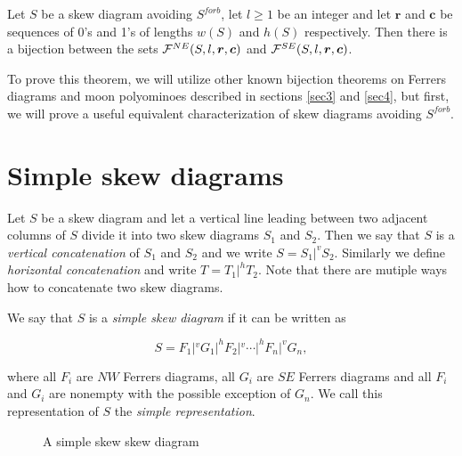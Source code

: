 \begin{thm} \label{thm_main}
Let $S$ be a skew diagram avoiding $S^{forb}$, let $l \geq 1$ be an integer and let $\bm{r}$ and $\bm{c}$ be sequences of 0's
and 1's of lengths $w(S)$ and $h(S)$ respectively. Then there is a bijection between 
the sets $\mathcal{F}^{NE}(S, l, \bm{r}, \bm{c})$ and $\mathcal{F}^{SE}(S, l, \bm{r}, \bm{c})$.
\end{thm}

To prove this theorem, we will utilize other known bijection theorems on Ferrers diagrams and moon polyominoes
described in sections \ref{sec3} and \ref{sec4}, but first,
we will prove a useful equivalent characterization of skew diagrams avoiding $S^{forb}$.

\section{Simple skew diagrams}

Let $S$ be a skew diagram and let a vertical line leading between two adjacent columns of $S$ divide it into two skew diagrams $S_1$ and
$S_2$. Then we say that $S$ is a \emph{vertical concatenation} of $S_1$ and $S_2$ and we write $S = S_1 |^v S_2$. Similarly we define
\emph{horizontal concatenation} and write $T = T_1 |^h T_2$. Note that there are mutiple ways how to concatenate two skew diagrams.

We say that $S$ is a \emph{simple skew diagram} if it can be written as 

$$S = F_1 |^v G_1 |^h F_2 |^v \cdots |^h F_n |^v G_n,$$

where all $F_i$ are $NW$ Ferrers diagrams, all $G_i$ are $SE$ Ferrers diagrams and all $F_i$ and $G_i$ are nonempty with the possible
exception of $G_n$. We call this representation of $S$ the \emph{simple representation}.

\begin{figure}[h]
\centering
{}
\caption{A simple skew skew diagram}
\end{figure}

